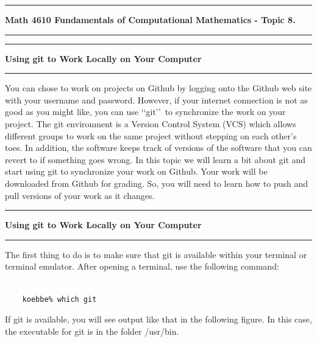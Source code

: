 \documentclass[10pt,fleqn]{article}
\begin{document}
\vskip0.1in\hrule\vskip0.1in \noindent
{\bf Math 4610 Fundamentals of Computational Mathematics  - Topic 8.}
\vskip0.1in\hrule\vskip0.1in \noindent
\vskip0.1in\hrule\vskip0.1in\noindent\noindent
{\bf Using git to Work Locally on Your Computer} 
\vskip0.1in\hrule\vskip0.1in\noindent
You can chose to work on projects on Github by logging onto the Github web site
with your username and password. However, if your internet connection is not as
good as you might like, you can use \lq\lq git\rq\rq\ to synchronize the work
on your project. The git environment is a Version Control System (VCS) which
allows different groups to work on the same project without stepping on each
other's toes. In addition, the software keeps track of versions of the software
that you can revert to if something goes wrong. In this topic we will learn a
bit about git and start using git to synchronize your work on Github. Your work
will be downloaded from Github for grading. So, you will need to learn how to
push and pull versions of your work as it changes.
\vskip0.1in\hrule\vskip0.1in\noindent\noindent
{\bf Using git to Work Locally on Your Computer} 
\vskip0.1in\hrule\vskip0.1in\noindent
The first thing to do is to make sure that git is available within your terminal
or terminal emulator. After opening a terminal, use the following command:
\begin{verbatim}

    koebbe% which git

\end{verbatim}
If git is available, you will see output like that in the following figure. In
this case, the executable for git is in the folder /usr/bin.
\end{document}
